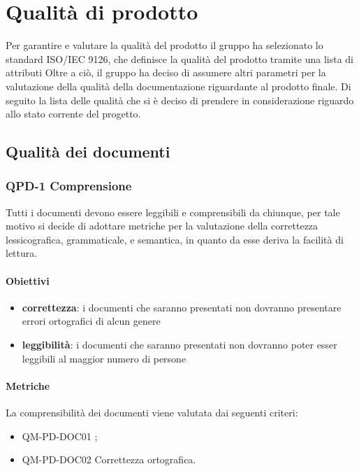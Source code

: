 \section{Qualità di prodotto}
	Per garantire e valutare la qualità del prodotto il gruppo ha selezionato lo standard ISO/IEC 9126, che definisce la qualità del prodotto tramite una lista di attributi
	Oltre a ciò, il gruppo ha deciso di assumere altri parametri per la valutazione della qualità della documentazione riguardante al prodotto finale.
	Di seguito la lista delle qualità che si è deciso di prendere in considerazione riguardo allo stato corrente del progetto.	
	\subsection{Qualità dei documenti}
	\subsubsection{QPD-1 Comprensione}
		Tutti i documenti devono essere leggibili e comprensibili da chiunque, per tale motivo si decide di adottare metriche per la valutazione della correttezza lessicografica, grammaticale, e semantica, in quanto da esse deriva la facilità di lettura.
		
	\paragraph{Obiettivi}
		\begin{itemize}
			\item \textbf{correttezza}: i documenti che saranno presentati non dovranno presentare errori ortografici di alcun genere
			\item \textbf{leggibilità}: i documenti che saranno presentati non dovranno poter esser leggibili al maggior numero di persone
		\end{itemize}
		
		
	\paragraph{Metriche}
	La comprensibilità dei documenti viene valutata dai seguenti criteri:
	\begin{itemize}
		\item QM-PD-DOC01 ;
     		\item QM-PD-DOC02 Correttezza ortografica.
	\end{itemize}

